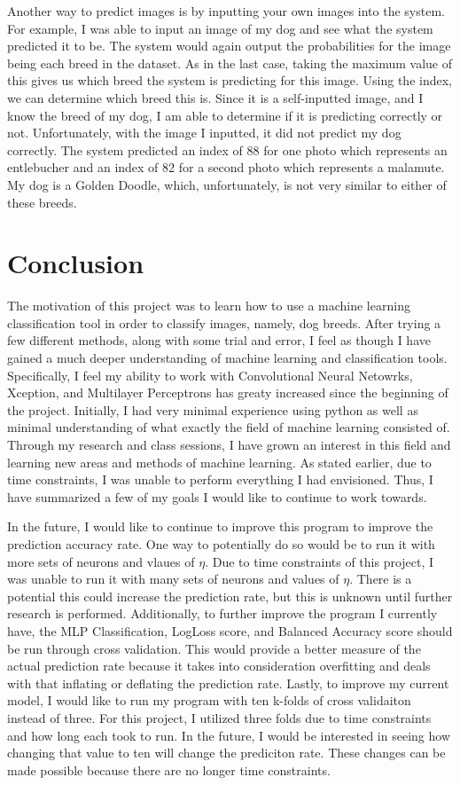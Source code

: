 \documentclass[12pt]{article}
\begin{document}
Another way to predict images is by inputting your own images into the system.  For example, I was able to input an image of my dog and see what the system predicted it to be.  The system would again output the probabilities for the image being each breed in the dataset.  As in the last case, taking the maximum value of this gives us which breed the system is predicting for this image.  Using the index, we can determine which breed this is.  Since it is a self-inputted image, and I know the breed of my dog, I am able to determine if it is predicting correctly or not.  Unfortunately, with the image I inputted, it did not predict my dog correctly.  The system predicted an index of 88 for one photo which represents an entlebucher and an index of 82 for a second photo which represents a malamute.  My dog is a Golden Doodle, which, unfortunately, is not very similar to either of these breeds.

\section{Conclusion}
\quad The motivation of this project was to learn how to use a machine learning classification tool in order to classify images, namely, dog breeds.  After trying a few different methods, along with some trial and error, I feel as though I have gained a much deeper understanding of machine learning and classification tools.  Specifically, I feel my ability to work with Convolutional Neural Netowrks, Xception, and Multilayer Perceptrons has greaty increased since the beginning of the project.  Initially, I had very minimal experience using python as well as minimal understanding of what exactly the field of machine learning consisted of.  Through my research and class sessions, I have grown an interest in this field and learning new areas and methods of machine learning.  As stated earlier, due to time constraints, I was unable to perform everything I had envisioned.  Thus, I have summarized a few of my goals I would like to continue to work towards.

In the future, I would like to continue to improve this program to improve the prediction accuracy rate.  One way to potentially do so would be to run it with more sets of neurons and vlaues of $\eta$.  Due to time constraints of this project, I was unable to run it with many sets of neurons and values of $\eta$.  There is a potential this could increase the prediction rate, but this is unknown until further research is performed.  Additionally, to further improve the program I currently have, the MLP Classification, LogLoss score, and Balanced Accuracy score should be run through cross validation.  This would provide a better measure of the actual prediction rate because it takes into consideration overfitting and deals with that inflating or deflating the prediction rate.  Lastly, to improve my current model, I would like to run my program with ten k-folds of cross validaiton instead of three.  For this project, I utilized three folds due to time constraints and how long each took to run.  In the future, I would be interested in seeing how changing that value to ten will change the prediciton rate.  These changes can be made possible because there are no longer time constraints.
\end{document}
